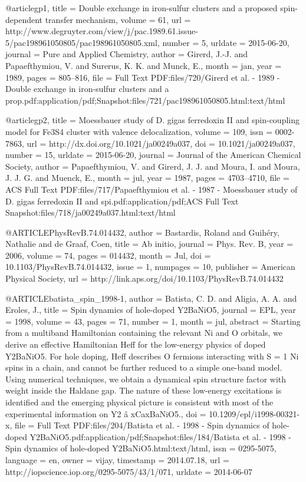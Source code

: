 @article{gp1,
	title = {Double exchange in iron-sulfur clusters and a proposed spin-dependent transfer mechanism},
	volume = {61},
	url = {http://www.degruyter.com/view/j/pac.1989.61.issue-5/pac198961050805/pac198961050805.xml},
	number = {5},
	urldate = {2015-06-20},
	journal = {Pure and Applied Chemistry},
	author = {Girerd, J.-J. and Papaefthymiou, V. and Surerus, K. K. and Munck, E.},
	month = jan,
	year = {1989},
	pages = {805--816},
	file = {Full Text PDF:files/720/Girerd et al. - 1989 - Double exchange in iron-sulfur clusters and a prop.pdf:application/pdf;Snapshot:files/721/pac198961050805.html:text/html}
}

@article{gp2,
	title = {Moessbauer study of {D}. gigas ferredoxin {II} and spin-coupling model for {Fe}3S4 cluster with valence delocalization},
	volume = {109},
	issn = {0002-7863},
	url = {http://dx.doi.org/10.1021/ja00249a037},
	doi = {10.1021/ja00249a037},
	number = {15},
	urldate = {2015-06-20},
	journal = {Journal of the American Chemical Society},
	author = {Papaefthymiou, V. and Girerd, J. J. and Moura, I. and Moura, J. J. G. and Muenck, E.},
	month = jul,
	year = {1987},
	pages = {4703--4710},
	file = {ACS Full Text PDF:files/717/Papaefthymiou et al. - 1987 - Moessbauer study of D. gigas ferredoxin II and spi.pdf:application/pdf;ACS Full Text Snapshot:files/718/ja00249a037.html:text/html}
}

@ARTICLE{PhysRevB.74.014432,
  author = {Bastardis, Roland and Guih{\'e}ry, Nathalie and de Graaf, Coen},
  title = {Ab initio},
  journal = {Phys. Rev. B},
  year = {2006},
  volume = {74},
  pages = {014432},
  month = {Jul},
  doi = {10.1103/PhysRevB.74.014432},
  issue = {1},
  numpages = {10},
  publisher = {American Physical Society},
  url = {http://link.aps.org/doi/10.1103/PhysRevB.74.014432}
}

@ARTICLE{batista_spin_1998-1,
  author = {Batista, C. D. and Aligia, A. A. and Eroles, J.},
  title = {Spin dynamics of hole-doped Y2BaNiO5},
  journal = {{EPL}},
  year = {1998},
  volume = {43},
  pages = {71},
  number = {1},
  month = jul,
  abstract = {Starting from a multiband Hamiltonian containing the relevant Ni and
	O orbitals, we derive an effective Hamiltonian Heff for the low-energy
	physics of doped Y2BaNiO5. For hole doping, Heff describes O fermions
	interacting with S = 1 Ni spins in a chain, and cannot be further
	reduced to a simple one-band model. Using numerical techniques, we
	obtain a dynamical spin structure factor with weight inside the Haldane
	gap. The nature of these low-energy excitations is identified and
	the emerging physical picture is consistent with most of the experimental
	information on Y2 â {xCaxBaNiO}5.},
  doi = {10.1209/epl/i1998-00321-x},
  file = {Full Text PDF:files/204/Batista et al. - 1998 - Spin dynamics of hole-doped Y2BaNiO5.pdf:application/pdf;Snapshot:files/184/Batista et al. - 1998 - Spin dynamics of hole-doped Y2BaNiO5.html:text/html},
  issn = {0295-5075},
  language = {en},
  owner = {vijay},
  timestamp = {2014.07.18},
  url = {http://iopscience.iop.org/0295-5075/43/1/071},
  urldate = {2014-06-07}
}

